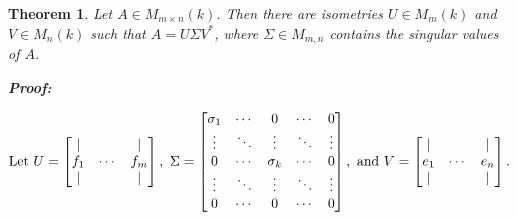 \documentclass{article}
\theoremstyle{colontheorem}
\newtheorem{theorem}{Theorem}[section]
\newenvironment{Theorem}
{
	\begin{mdframed}[backgroundcolor=TheoremOrange!10]
	\begin{theorem}
}
{
	\end{theorem}
	\end{mdframed}
	
	\vspace{.15in}
}
\newenvironment{Proof}
{
	\begin{mdframed}[backgroundcolor=ProofPurple!10]
	\textbf{Proof:}%
}
{
	\end{mdframed}
	
	\vspace{.085in}
}
\begin{document}
\begin{Theorem}
	
	Let $A \in M_{m \times n}(k)$. Then there are isometries $U \in M_m(k)$ and $V \in M_n(k)$ such that $A = U \Sigma V^*$, where $\Sigma \in M_{m, n}$ contains the singular values of $A$.
	
	\begin{Proof}
		$$\textnormal{Let}\ U = \begin{bmatrix}
		
		| & & |\\
		f_1 & \cdots & f_m\\
		| & & |
		
		\end{bmatrix},\ \Sigma = \begin{bmatrix}
		
		\sigma_1 & \cdots & 0 & \cdots & 0\\
		\vdots & \ddots & \vdots & \ddots & \vdots\\
		0 & \cdots & \sigma_k & \cdots & 0\\
		\vdots & \ddots & \vdots & \ddots & \vdots\\
		0 & \cdots & 0 & \cdots & 0
		
		\end{bmatrix},\ \textnormal{and}\ V = \begin{bmatrix}
		
		| & & |\\
		e_1 & \cdots & e_n\\
		| & & |
		
		\end{bmatrix}.$$
		
	\end{Proof}
	
\end{Theorem}
\end{document}
